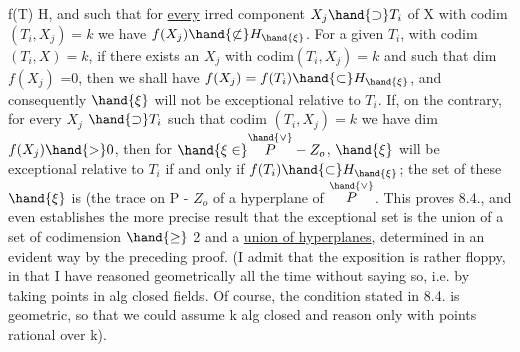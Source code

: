  f(T) \hand{$\subset$} H, and such that for \uline{every} irred component $X_j \hand{\supset} T_i$ of X
with codim $(T_i,X_j)=k$ we have $f(X_j)\hand{\not\subset} H_{\hand{\xi}}$. For a given $T_i$,
 with codim$(T_i,X)=k$, if there exists an $X_j$ with codim$(T_i,X_j)=k$
and such that dim $f(X_j)$ =0, then 
 we shall have $f(X_j) = f(T_i) \hand{\subset} H_{\hand{\xi}}$, and consequently $\hand{\xi}$ will
not be exceptional relative to $T_i$. If, on the contrary, for every $X_j$
$\hand{\supset} T_i$ such that codim $(T_i,X_j) = k$ we have dim $f(X_j) \hand{>} 0$, then for
$\hand{\xi \in} \overset{\hand{\vee}}{P} - Z_o$, $\hand{\xi}$ will be exceptional relative to $T_i$ if and only if
$f(T_i) \hand{\subset} H_{\hand{\xi}}$; the set of these $\hand{\xi}$ is (the trace on P - $Z_o$ of\hand{)} a hyperplane
of $\overset{\hand{\vee}}{P}$. This proves 8.4., and even establishes the more precise result
that the exceptional set is the union of a set of codimension
$\hand{\geq}$ 2 and a \uline{union of hyperplanes}, determined in an evident way by the
preceding proof. (I admit that the exposition is rather floppy, 
in that I have reasoned geometrically all the time without saying so, i.e.
by taking points in alg closed fields. Of course, the condition
stated in 8.4. is  geometric, so that we could assume
k alg closed and reason only with points rational over k).

 

